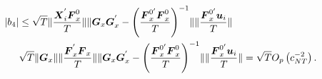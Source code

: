 \documentclass[12pt,a4paper,hyperref]{article}
\DeclarePairedDelimiter\abs{\lvert}{\rvert}%
\DeclarePairedDelimiter\norm{\lVert}{\rVert}%
\begin{document}
\begin{align}
\begin{split}
\abs{b_{4}}&\leq   \sqrt{T}\norm{\frac{\boldsymbol{X}^{'}_{i}\boldsymbol{F}^{0}_{x} }{T}}  \norm{\boldsymbol{G}_{x}\boldsymbol{G}^{'}_{x}-\left(\frac{\boldsymbol{F}^{0'}_{x}\boldsymbol{F}^{0}_{x}}{T}  \right)^{-1} }\norm{\frac{\boldsymbol{F}^{0'}_{x}\boldsymbol{u}_{i}}{T}} \\
& \sqrt{T} \norm{\boldsymbol{G}_{x} } \norm{\frac{\boldsymbol{F}^{'}_{x}\boldsymbol{F}_{x}}{T}}  \norm{\boldsymbol{G}_{x}\boldsymbol{G}^{'}_{x}-\left(\frac{\boldsymbol{F}^{0'}_{x}\boldsymbol{F}^{0}_{x}}{T}  \right)^{-1} } \norm{\frac{\boldsymbol{F}^{0'}_{x}\boldsymbol{u}_{i}}{T} }=\sqrt{T}O_{p}\left( c^{-2}_{NT} \right).
\end{split}
\end{align}
\end{document}
